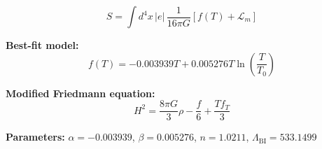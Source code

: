 
\begin{equation}
  S = \int d^4x \, |e| \, \frac{1}{16\pi G} \left[ f(T) + \mathcal{L}_m \right]
\end{equation}

\textbf{Best-fit model:}
\begin{equation}
  f(T) = -0.003939 T + 0.005276 T \ln\!\left(\frac{T}{T_0}\right)
\end{equation}

\textbf{Modified Friedmann equation:}
\begin{equation}
  H^2 = \frac{8\pi G}{3} \rho - \frac{f}{6} + \frac{T f_T}{3}
\end{equation}

\textbf{Parameters:}
$\alpha = -0.003939$, \quad
$\beta = 0.005276$, \quad
$n = 1.0211$, \quad
$\Lambda_{\text{BI}} = 533.1499$